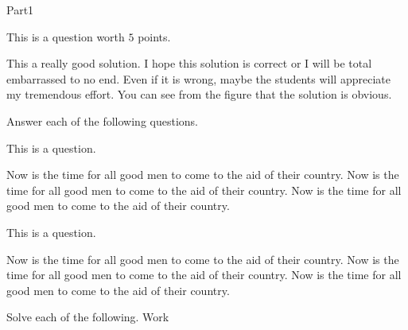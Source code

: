 \documentclass[10pt]{article}
\begin{document}
\begin{exam}[Part I.]{Part1}
%

\begin{problem}[5]
This is a question worth $5$ points.

\begin{solution}[1.5in]
This a really good  solution. I hope this solution is correct or I will be total
embarrassed to no end. Even if it is wrong, maybe the students will appreciate
my tremendous effort. You can see from the figure that the solution is obvious.
\end{solution}
\end{problem}


\begin{problem*}[10ea]
Answer each of the following questions.
\begin{parts}
\item This is a question.
\begin{solution}[1in]
Now is the time for all good men to come to the aid of their country.
Now is the time for all good men to come to the aid of their country.
Now is the time for all good men to come to the aid of their country.
\end{solution}
\item This is a question.
\begin{solution}[1in]
Now is the time for all good men to come to the aid of their country.
Now is the time for all good men to come to the aid of their country.
Now is the time for all good men to come to the aid of their country.
\end{solution}
\end{parts}
\end{problem*}


\begin{problem*}[12]
Solve each of the following. Work \OnBackOfPage
\begin{multicols}{2}

\def\solnsp{1in}


\end{multicols}
\end{problem*}
\end{exam}
\end{document}
